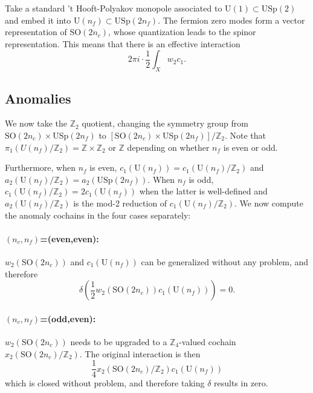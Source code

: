 \documentclass[12pt]{article}
\numberwithin{equation}{section}
\def\bZ{\mathbb{Z}}
\def\U{\mathrm{U}}
\def\SO{\mathrm{SO}}
\def\USp{\mathrm{USp}}
\begin{document}
Take a standard 't Hooft-Polyakov monopole associated to $\U(1)\subset \USp(2)$
and embed it into  $\U(n_f)\subset \USp(2n_f)$.
The fermion zero modes form a vector representation of $\SO(2n_c)$,
whose quantization leads to the spinor representation.
This means that there is an effective interaction \begin{equation}
2\pi i \cdot \frac12 \int_X w_2 c_1.
\end{equation} %

\subsection{Anomalies}
We now take the $\bZ_2$ quotient, changing the symmetry group from 
$\SO(2n_c)\times \USp(2n_f)$ to $[\SO(2n_c)\times \USp(2n_f)]/\bZ_2$.
Note that $\pi_1(U(n_f)/\bZ_2)=\bZ\times \bZ_2$  or $\bZ$ depending on whether $n_f$ is even or odd.

Furthermore, when $n_f$ is even, $c_1(\U(n_f)) = c_1(\U(n_f)/\bZ_2)$ and $a_2(\U(n_f)/\bZ_2)=a_2(\USp(2n_f))$.
When $n_f$ is odd, $c_1(\U(n_f)/\bZ_2)=2 c_1(\U(n_f))$ when the latter is well-defined and $a_2(\U(n_f)/\bZ_2)$ is the mod-2 reduction of $c_1(\U(n_f)/\bZ_2)$.
We now compute the anomaly cochains in the four cases separately:
\paragraph{$(n_c,n_f)$=(even,even):}
$w_2(\SO(2n_c))$ and $c_1(\U(n_f))$ can be generalized without any problem,
and therefore \begin{equation}
\delta\left(\frac12 w_2(\SO(2n_c)) c_1(\U(n_f))\right) = 0.
\end{equation}

\paragraph{$(n_c,n_f)$=(odd,even):}
$w_2(\SO(2n_c))$ needs to be upgraded to a $\bZ_4$-valued cochain $x_2(\SO(2n_c)/\bZ_2)$.
The original interaction is then \begin{equation}
\frac14 x_2(\SO(2n_c)/\bZ_2) c_1(\U(n_f))
\end{equation}
which is closed without problem,
and therefore taking $\delta$ results in zero.
\end{document}
